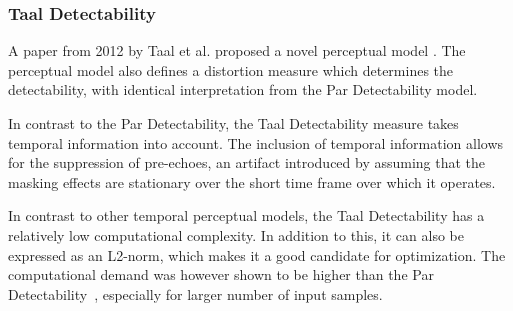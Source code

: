 \subsubsection{Taal Detectability}
A paper from 2012 by Taal et al. proposed a novel perceptual model \cite{taal2012low}.
The perceptual model also defines a distortion measure which determines the detectability, with identical interpretation from the Par Detectability model.

In contrast to the Par Detectability, the Taal Detectability measure takes temporal information into account.
The inclusion of temporal information allows for the suppression of pre-echoes, 
an artifact introduced by assuming that the masking effects are stationary over the short time frame over which it operates.

In contrast to other temporal perceptual models, the Taal Detectability has a relatively low computational complexity.
In addition to this, it can also be expressed as an L2-norm, which makes it a good candidate for optimization.
The computational demand was however shown to be higher than the Par Detectability~\cite{taal2012low}, especially for larger number of input samples.
